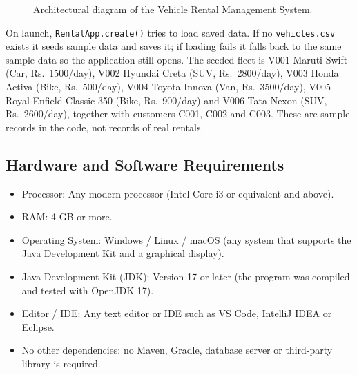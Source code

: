 \documentclass[11pt,a4paper]{article}
\begin{document}
\begin{figure}[h]
\centering
{}
\caption{Architectural diagram of the Vehicle Rental Management System.}
\end{figure}

On launch, \texttt{RentalApp.create()} tries to load saved data. If
no \texttt{vehicles.csv} exists it seeds sample data and saves it;
if loading fails it falls back to the same sample data so the
application still opens. The seeded fleet is V001 Maruti Swift
(Car, Rs.\ 1500/day), V002 Hyundai Creta (SUV, Rs.\ 2800/day),
V003 Honda Activa (Bike, Rs.\ 500/day), V004 Toyota Innova
(Van, Rs.\ 3500/day), V005 Royal Enfield Classic 350 (Bike,
Rs.\ 900/day) and V006 Tata Nexon (SUV, Rs.\ 2600/day), together
with customers C001, C002 and C003. These are sample records in the
code, not records of real rentals.

\subsection{Hardware and Software Requirements}

\begin{itemize}
  \item Processor: Any modern processor (Intel Core i3 or equivalent
        and above).
  \item RAM: 4 GB or more.
  \item Operating System: Windows / Linux / macOS (any system that
        supports the Java Development Kit and a graphical display).
  \item Java Development Kit (JDK): Version 17 or later (the program
        was compiled and tested with OpenJDK 17).
  \item Editor / IDE: Any text editor or IDE such as VS Code,
        IntelliJ IDEA or Eclipse.
  \item No other dependencies: no Maven, Gradle, database server or
        third-party library is required.
\end{itemize}
\end{document}
